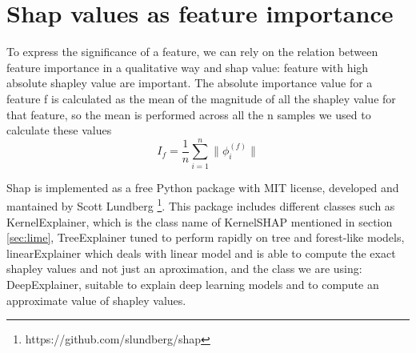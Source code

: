 \documentclass[11pt]{report}
\begin{document}
\section{Shap values as feature importance}

To express the significance of a feature, we can rely on the relation between feature importance in a qualitative way and shap value: feature with high absolute shapley value are important.
The absolute importance value for a feature f is calculated as the mean of the magnitude of all the shapley value for that feature, so the mean is performed across all the n samples we used to calculate these values
\begin{equation}\label{eq:shap_magnitude}
I_f = \frac{1}{n} \sum_{i = 1}^n \|\phi_i^{(f)}\|
\end{equation}

Shap is implemented as a free Python package with MIT license, developed and mantained by Scott Lundberg \footnote{https://github.com/slundberg/shap}.
This package includes different classes such as KernelExplainer, which is the class name of KernelSHAP mentioned in section \ref{sec:lime}, TreeExplainer tuned to perform rapidly on tree and forest-like models, linearExplainer which deals with linear model and is able to compute the exact shapley values and not just an aproximation, and the class we are using: DeepExplainer, suitable to explain deep learning models and to compute an approximate value of shapley values.


\newpage





\end{document}
